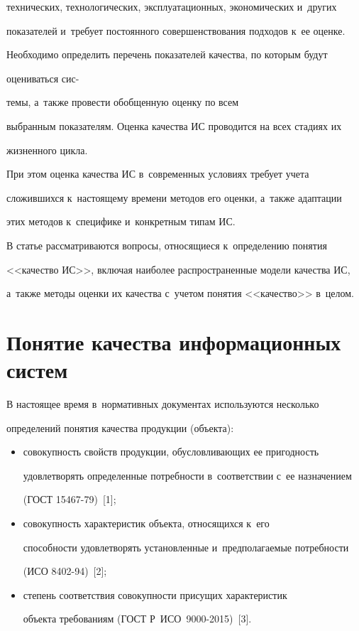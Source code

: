 технических, технологических, эксплуатационных, экономических и~других 

показателей и~требует постоянного совершенствования подходов к~ее оценке. 

Необходимо определить перечень показателей качества, по которым будут 

оцениваться сис-\linebreak\vspace*{-12pt}



\pagebreak



\noindent

те\-мы, а~также провести обобщенную оценку по всем 

выбранным показателям. Оценка качества ИС проводится на всех стадиях их 

жизненного цикла. 


     При этом оценка качества ИС в~современных условиях требует учета 

сложившихся к~на\-сто\-яще\-му времени методов его оценки, а~также адап\-та\-ции 

этих методов к~специфике и~конкретным типам ИС. 

     

     В статье рассматриваются вопросы, относящиеся к~определению понятия 

<<качество ИС>>, включая наиболее распространенные модели качества ИС, 

а~так\-же методы оценки их качества с~учетом понятия <<качество>> в~целом.

     

\section{Понятие качества информационных систем}



     В настоящее время в~нормативных документах используются несколько 

определений понятия качества продукции (объекта):

     \begin{itemize}

     \item совокупность свойств продукции, обуслов\-ли\-ва\-ющих ее при\-год\-ность 

удовлетворять определенные по\-треб\-но\-сти в~соответствии с~ее назначением 

(ГОСТ 15467-79)~[1];

     \item совокупность характеристик объекта, относящихся к~его 

спо\-соб\-ности удовлетворять уста\-нов\-лен\-ные и~предполагаемые по\-треб\-но\-сти 

(ИСО 8402-94)~[2];

     \item степень соответствия совокупности присущих характеристик 

объекта требованиям (ГОСТ Р~ИСО~9000-2015)~[3].

     \end{itemize}


